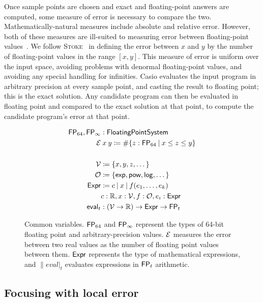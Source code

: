 \documentclass[paper.tex]{subfiles}
\begin{document}
Once sample points are chosen
  and exact and floating-point answers are computed,
  some measure of error is necessary to compare the two.
Mathematically-natural measures include absolute and relative error.
However, both of these measures are ill-suited
  to measuring error between floating-point values~\cite{}.
We follow \textsc{Stoke}~\cite{} in defining the error between $x$ and $y$
  by the number of floating-point values in the range $[x, y]$.
This measure of error is uniform over the input space,
  avoiding problems with denormal floating-point values,
  and avoiding any special handling for infinities.
Casio evaluates the input program in arbitrary precision at every sample point,
  and casting the result to floating point; this is the exact solution.
Any candidate program can then be evaluated in floating point
  and compared to the exact solution at that point,
  to compute the candidate program's error at that point.

\begin{figure}
\begin{align*}
  \FP_{64}, \FP_\infty &: \|FloatingPointSystem| \\
  \Err &\:x\:y \ceq \#\{ z : \FP_{64}\:|\:x \le z \le y \} \\
  \\
  \Var &\ceq \{ x, y, z, \dotsc \} \\
  \Op &\ceq \{ \|exp|, \|pow|, \|log|, \dotsc \} \\
  \Expr &\ceq c \I x \I f(e_1, \dotsc, e_k) \\
  & c : \RR, x : \Var, f : \Op, e_i : \Expr \\
  \|eval|_t &: (\Var \to \RR) \to \Expr \to \FP_t
\end{align*}
\caption{Common variables. $\mathsf{FP}_{64}$ and $\mathsf{FP}_\infty$ represent
  the types of 64-bit floating point and arbitrary-precision values.
  $\mathcal{E}$ measures the error between two real values
  as the number of floating point values between them.
  $\mathsf{Expr}$ represents the type of mathematical expressions,
  and $\|eval|_t$ evaluates expressions in $\mathsf{FP}_t$ arithmetic.}
\label{alg:defs}
\end{figure}

\subsection{Focusing with local error}
\end{document}
